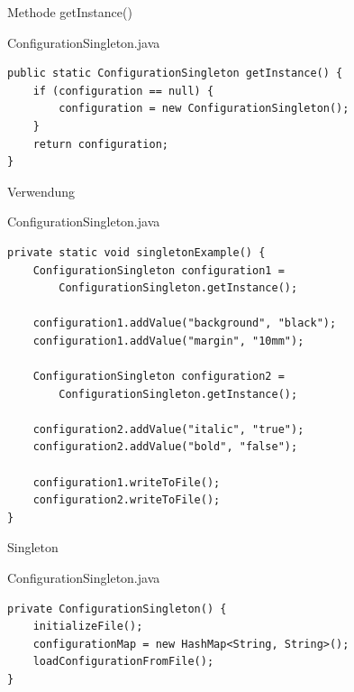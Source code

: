 
\begin{frame}[fragile]{Methode getInstance()}
	\begin{exampleblock}{ConfigurationSingleton.java}
		\begin{lstlisting}
public static ConfigurationSingleton getInstance() {
    if (configuration == null) {
        configuration = new ConfigurationSingleton();
    }
    return configuration;
}		    
		\end{lstlisting}
 	\end{exampleblock}
\end{frame}


\begin{frame}[fragile]{Verwendung}
	\begin{exampleblock}{ConfigurationSingleton.java}
		\begin{lstlisting}
private static void singletonExample() {
    ConfigurationSingleton configuration1 = 
        ConfigurationSingleton.getInstance();
 
    configuration1.addValue("background", "black");
    configuration1.addValue("margin", "10mm");
    
    ConfigurationSingleton configuration2 = 
        ConfigurationSingleton.getInstance();
    
    configuration2.addValue("italic", "true");
    configuration2.addValue("bold", "false");
    
    configuration1.writeToFile();
    configuration2.writeToFile();
}
	 	\end{lstlisting}
 	\end{exampleblock}
\end{frame}


\begin{frame}[fragile]{Singleton}
	\begin{exampleblock}{ConfigurationSingleton.java}
		\begin{lstlisting}
private ConfigurationSingleton() {
    initializeFile();
    configurationMap = new HashMap<String, String>();
    loadConfigurationFromFile();
}
	 	\end{lstlisting}
 	\end{exampleblock}
\end{frame}


